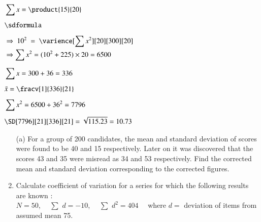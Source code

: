 \documentclass[12pt]{article}
\begin{document}
\vspace{1ex}
\begin{minipage}[t]{0.49\linewidth}
   \noindent
   $\begin{aligned}
      &\sum{x} = \product{15}{20}\\[1ex]
      &\sdformula\\[1ex]
      &\Rightarrow \ 10^2 \ = \ \varience[\sum{x^2}][20][300][20]\\
      &\Rightarrow \sum{x^2} = (10^2 + 225) \times 20 = 6500\\
   \end{aligned}$

\end{minipage}\vrule\hspace{1ex}
\begin{minipage}[t]{0.49\linewidth}
   \noindent
   $\begin{aligned}
      &\sum{x} = 300+36 = 336\\[1ex]
      &\bar{x} = \fracv[1]{336}{21}\\[1ex]
      &\sum{x^2} = 6500+36^2 = 7796\\[1ex]
      &\SD[7796][21][336][21] = \sqrt{115.23} = 10.73\\
   \end{aligned}$
\end{minipage}


\pagebreak
\begin{enumerate}[label=(\alph*)]
   \item[\mred{Q3.} (a)] For a group of 200 candidates, the mean and standard deviation of scores were found to be 40 and 15 respectively. Later on it was discovered that the scores 43 and 35 were misread as 34 and 53 respectively. Find the corrected mean and standard deviation corresponding to the corrected figures.\\[-3ex]
   \item Calculate coefficient of variation for a series for which the following results are known :\\
   $N=50$, \ \ \footnotesize{$\sum$} \normalsize{$d=-10$}, \ \ \footnotesize{$\sum$} \normalsize{$d^2=404$ \ \ where $d =$ deviation of items from assumed mean 75.}
\end{enumerate}
\end{document}
